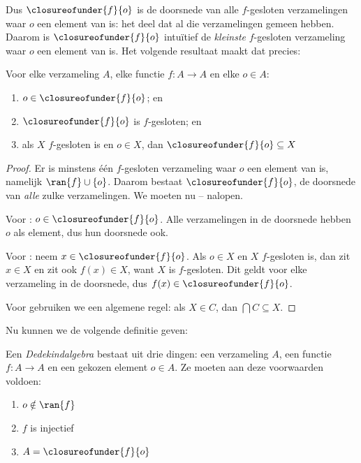 \documentclass[../../../include/open-logic-section]{subfiles}
\begin{document}
Dus $\closureofunder{f}{o}$ is de doorsnede van alle $f$-gesloten
verzamelingen waar $o$ een element van is: het deel dat al die
verzamelingen gemeen hebben. Daarom is $\closureofunder{f}{o}$
intuïtief de \emph{kleinste} $f$-gesloten verzameling waar $o$ een
element van is. Het volgende resultaat maakt dat precies:
\begin{lem}
	Voor elke verzameling $A$, elke functie $f \colon A \to A$ en elke
	$o \in A$:
	\begin{enumerate}
		\item{} $o \in \closureofunder{f}{o}$; en
		\item{} $\closureofunder{f}{o}$ is $f$-gesloten; en
		\item{} als $X$ $f$-gesloten is en $o \in
		X$, dan $\closureofunder{f}{o} \subseteq X$
	\end{enumerate}
\end{lem}

\begin{proof}
Er is minstens één $f$-gesloten verzameling waar $o$ een element van
is, namelijk $\ran{f}\cup \{o\}$. Daarom bestaat
$\closureofunder{f}{o}$, de doorsnede van \emph{alle} zulke
verzamelingen. We moeten nu
-- nalopen.

Voor : $o \in \closureofunder{f}{o}$. Alle
verzamelingen in de doorsnede hebben $o$ als element, dus hun doorsnede
ook.

Voor : neem $x \in \closureofunder{f}{o}$. Als
$o \in X$ en $X$ $f$-gesloten is, dan zit $x \in X$ en zit ook
$f(x) \in X$, want $X$ is $f$-gesloten. Dit geldt voor elke verzameling
in de doorsnede, dus $f(x) \in \closureofunder{f}{o}$.

Voor  gebruiken we een algemene regel: als
$X \in C$, dan $\bigcap C \subseteq X$.
\end{proof}

Nu kunnen we de volgende definitie geven:

\begin{defn}
Een \emph{Dedekindalgebra} bestaat uit drie dingen: een verzameling
$A$, een functie $f \colon A \to A$ en een gekozen element $o \in A$.
Ze moeten aan deze voorwaarden voldoen:
	\begin{enumerate}
		\item {} $o \notin \ran{f}$
		\item {} $f$ is injectief
		\item {} $A = \closureofunder{f}{o}$
	\end{enumerate}
\end{defn}
\end{document}
